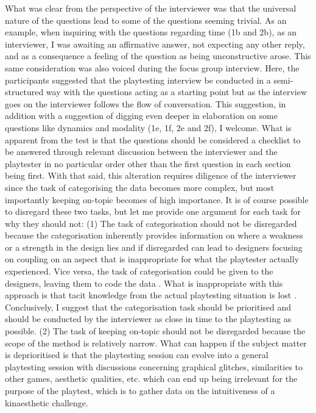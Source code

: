 What was clear from the perspective of the interviewer was that the universal nature of the questions lead to some of the questions seeming trivial. As an example, when inquiring with the questions regarding time (1b and 2b), as an interviewer, I was awaiting an affirmative answer, not expecting any other reply, and as a consequence a feeling of the question as being unconstructive arose. This same consideration was also voiced during the focus group interview. Here, the participants suggested that the playtesting interview be conducted in a semi-structured way with the questions acting as a starting point but as the interview goes on the interviewer follows the flow of conversation. This suggestion, in addition with a suggestion of digging even deeper in elaboration on some questions like dynamics and modality (1e, 1f, 2e and 2f), I welcome. What is apparent from the test is that the questions should be considered a checklist to be answered through relevant discussion between the interviewer and the playtester in no particular order other than the first question in each section being first. With that said, this alteration requires diligence of the interviewer since the task of categorising the data becomes more complex, but most importantly keeping on-topic becomes of high importance. It is of course possible to disregard these two tasks, but let me provide one argument for each task for why they should not: (1) The task of categorisation should not be disregarded because the categorisation inherently provides information on where a weakness or a strength in the design lies and if disregarded can lead to designers focusing on coupling on an aspect that is inappropriate for what the playtester actually experienced. Vice versa, the task of categorisation could be given to the designers, leaving them to code the data \cite{cresswell}. What is inappropriate with this approach is that tacit knowledge from the actual playtesting situation is lost \cite{cresswell}. Conclusively, I suggest that the categorisation task should be prioritised and should be conducted by the interviewer as close in time to the playtesting as possible. (2) The task of keeping on-topic should not be disregarded because the scope of the method is relatively narrow. What can happen if the subject matter is deprioritised is that the playtesting session can evolve into a general playtesting session with discussions concerning graphical glitches, similarities to other games, aesthetic qualities, etc. which can end up being irrelevant for the purpose of the playtest, which is to gather data on the intuitiveness of a kinaesthetic challenge.

